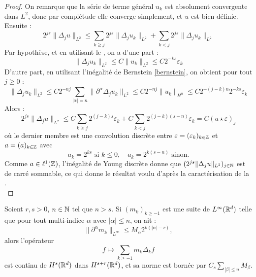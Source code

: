 \documentclass[11pt,a4paper]{article}
\begin{document}
\begin{proof}
On remarque que la série de terme général $u_k$ est absolument convergente dans $L^2$, donc par complétude elle converge simplement, et $u$ est bien définie. Ensuite : 
\begin{equation*}
2^{js}\|\Delta_ju\|_{L^2} \leq \sum_{k\geq j} 2^{js}\|\Delta_ju_k\|_{L^2} + \sum_{k < j} 2^{js}\|\Delta_ju_k\|_{L^2}
\end{equation*}
Par hypothèse, et en utilisant le , on a d'une part :
\begin{equation*}
\|\Delta_ju_k\|_{L^2} \leq C \|u_k\|_{L^2} \leq C2^{-ks}\varepsilon_k
\end{equation*}
D'autre part, en utilisant l'inégalité de Bernstein \eqref{bernstein}, on obtient pour tout $j\geq 0$ :
\begin{equation*}
\|\Delta_ju_k\|_{L^2} \leq C 2^{-nj} \sum_{|\alpha|=n} \|\partial^\alpha\Delta_ju_k\|_{L^2} \leq C 2^{-nj} \|u_k\|_{H^n} \leq C 2^{-(j-k)n}2^{-ks}\varepsilon_k
\end{equation*}
Alors :
\begin{equation*}
2^{js}\|\Delta_ju\|_{L^2} \leq C \sum_{k\geq j} 2^{(j-k)s}\varepsilon_k + C \sum_{k < j} 2^{(j-k)(s-n)}\varepsilon_k = C (a \star \varepsilon)_j
\end{equation*}
où le dernier membre est une convolution discrète entre $\varepsilon = (\varepsilon_k)_{k\in \mathbb Z}$ et  $a = (a)_{k\in \mathbb Z}$ avec
\[a_k=2^{ks} \text{ si } k \leq 0, \quad a_k=2^{k(s-n)} \text{ sinon.}\]
Comme $a\in \ell^1(\mathbb Z)$, l'inégalité de Young discrète donne que $(2^{js}\|\Delta_ju\|_{L^2})_{j\in \mathbb N}$ est de carré sommable, ce qui donne le résultat voulu d'après la caractérisation de la . \\
\end{proof}


\begin{cor}\label{true_meyer}
Soient $r,s>0$, $n\in\mathbb N$ tel que $n>s$. Si $(m_k)_{k \geq -1}$ est une suite de $L^\infty(\mathbb R^d)$ telle que pour tout multi-indice $\alpha$ avec $|\alpha|\leq n$, on ait :
\begin{equation*}
\|\partial^\alpha m_k\|_{L^\infty} \leq M_\alpha 2^{k(|\alpha|-r)},
\end{equation*}
alors l'opérateur 
\begin{equation*}
f \mapsto \sum_{k\geq -1} m_k\Delta_kf
\end{equation*}
est continu de $H^s(\mathbb R^d)$ dans $H^{s+r}(\mathbb R^d)$, et sa norme est bornée par $C_s\displaystyle \sum_{|\beta|\leq n} M_\beta$.
\end{cor}
\end{document}
